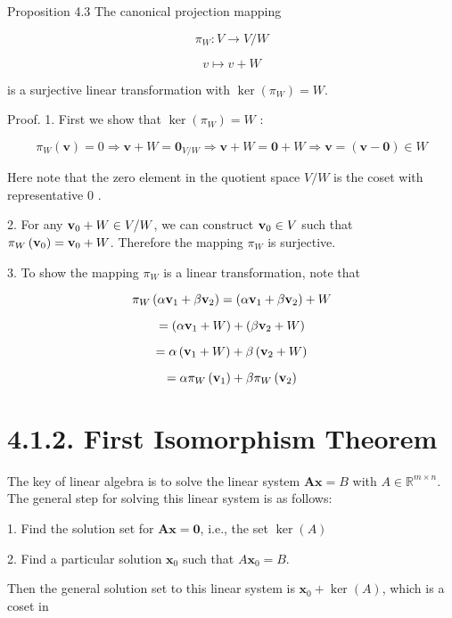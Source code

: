 \documentclass[11pt]{article}
\begin{document}
Proposition 4.3 The canonical projection mapping

\[
{\pi }_{W} : V \rightarrow  V/W
\]

\[
v \mapsto  v + W
\]

is a surjective linear transformation with \(\ker \left( {\pi }_{W}\right)  = W\).

Proof. 1. First we show that \(\ker \left( {\pi }_{W}\right)  = W\) :

\[
{\pi }_{W}\left( \mathbf{v}\right)  = 0 \Rightarrow  \mathbf{v} + W = {\mathbf{0}}_{V/W} \Rightarrow  \mathbf{v} + W = \mathbf{0} + W \Rightarrow  \mathbf{v} = \left( {\mathbf{v} - \mathbf{0}}\right)  \in  W
\]

Here note that the zero element in the quotient space \(V/W\) is the coset with representative 0 .

2. For any \({\bf v}_{0} + W \in  V/W\), we can construct \({\bf v}_{0} \in  V\) such that \({\pi }_{W}\left( {\bf v}_{0}\right)  = {\bf v}_{0} + W\). Therefore the mapping \({\pi }_{W}\) is surjective.

3. To show the mapping \({\pi }_{W}\) is a linear transformation, note that

\[
{\pi }_{W}\left( {\alpha {\bf v}_1 + \beta {\bf v}_2}\right)  = \left( {\alpha {\bf v}_1 + \beta {\bf v}_2}\right)  + W
\]

\[
= \left( {\alpha {\bf v}_1 + W}\right)  + \left( {\beta {\bf v}_2 + W}\right)
\]

\[
= \alpha \left( {{\bf v}_1 + W}\right)  + \beta \left( {{\bf v}_2 + W}\right)
\]

\[
= \alpha {\pi }_{W}\left( {\bf v}_1\right)  + \beta {\pi }_{W}\left( {\bf v}_2\right)
\]

\section*{4.1.2. First Isomorphism Theorem}

The key of linear algebra is to solve the linear system \(\mathbf{{Ax}} = B\) with \(A \in  {\mathbb{R}}^{m \times  n}\). The general step for solving this linear system is as follows:

1. Find the solution set for \(\mathbf{{Ax}} = \mathbf{0}\), i.e., the set \(\ker \left( A\right)\)

2. Find a particular solution \({\mathbf{x}}_{0}\) such that \(A{\mathbf{x}}_{0} = B\).

Then the general solution set to this linear system is \({\mathbf{x}}_{0} + \ker \left( A\right)\), which is a coset in
\end{document}
